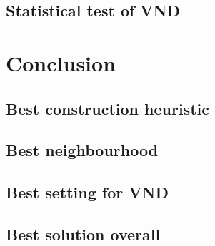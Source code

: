 \documentclass[12pt,a4paper]{article}
\begin{document}
\subsection{Statistical test of VND}

\section{Conclusion}

\subsection{Best construction heuristic}

\subsection{Best neighbourhood}

\subsection{Best setting for VND}

\subsection{Best solution overall}
\end{document}
